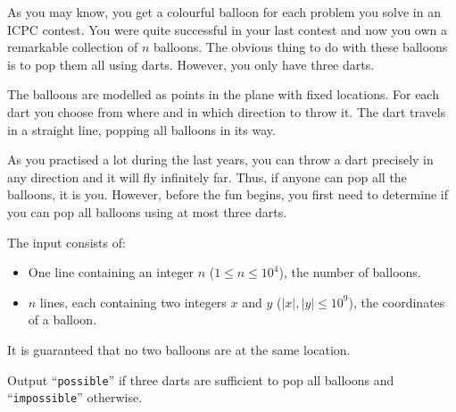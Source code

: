 
%
As you may know, you get a colourful balloon for each problem you solve in an ICPC contest.
You were quite successful in your last contest
and now you own a remarkable collection of $n$ balloons.
The obvious thing to do with these balloons is to pop them all using darts.
However, you only have three darts.

The balloons are modelled as points in the plane with fixed locations.
For each dart you choose from where and in which direction to throw it.
The dart travels in a straight line, popping all balloons in its way.

As you practised a lot during the last years,
you can throw a dart precisely in any direction and it will fly infinitely far.
Thus, if anyone can pop all the balloons, it is you. 
However, before the fun begins, you first need to determine
if you can pop all balloons using at most three darts.

\begin{Input}
  The input consists of:
  \begin{itemize}
    \item One line containing an integer $n$ ($1 \leq n \leq 10^4$), the number of balloons.
    \item $n$ lines, each containing two integers $x$ and $y$ ($|x|, |y| \leq 10^9$), the coordinates of a balloon.
  \end{itemize}
  It is guaranteed that no two balloons are at the same location.
\end{Input}

\begin{Output}
  Output ``\texttt{possible}'' if three darts are sufficient to pop all balloons and ``\texttt{impossible}'' otherwise.
\end{Output}
